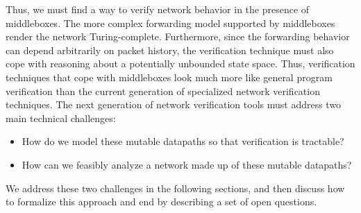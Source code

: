 \cbstart
Thus, we must find a way to verify network behavior in the presence of middleboxes. The more complex forwarding model supported by middleboxes render the network Turing-complete. Furthermore, since the forwarding behavior can depend arbitrarily on packet history, the verification technique must also cope with reasoning about a potentially unbounded state space. Thus, verification techniques that cope with middleboxes look much more like general program verification than the current generation of specialized network verification techniques. The next generation of network verification tools must address two main technical challenges:
\begin{itemize}
\item How do we model these mutable datapaths so that verification is tractable?
\item How can we feasibly analyze a network made up of these mutable datapaths?
\end{itemize}
We address these two challenges in the following sections, and then discuss  how to formalize this approach and end by describing a set of open questions.
\cbend